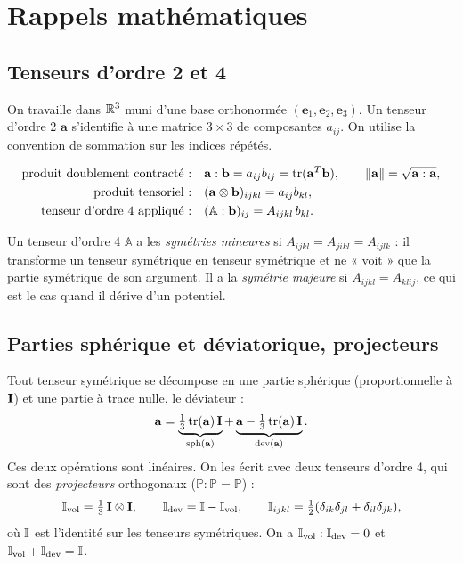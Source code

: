 \section{Rappels mathématiques}\label{sec:maths}

\subsection{Tenseurs d'ordre 2 et 4}

On travaille dans $\mathbb{R}^3$ muni d'une base orthonormée $(\mathbf{e}_1,\mathbf{e}_2,\mathbf{e}_3)$. Un tenseur d'ordre 2 $\mathbf{a}$ s'identifie à une matrice $3\times3$ de composantes $a_{ij}$. On utilise la convention de sommation sur les indices répétés.

\begin{definition}[Produits]
\begin{align*}
\text{produit doublement contracté :}\quad & \mathbf{a}:\mathbf{b} = a_{ij}b_{ij} = \operatorname{tr}(\mathbf{a}^T\mathbf{b}),\qquad \|\mathbf{a}\| = \sqrt{\mathbf{a}:\mathbf{a}},\\
\text{produit tensoriel :}\quad & (\mathbf{a}\otimes\mathbf{b})_{ijkl} = a_{ij}b_{kl},\\
\text{tenseur d'ordre 4 appliqué :}\quad & (\mathbb{A}:\mathbf{b})_{ij} = A_{ijkl}\,b_{kl}.
\end{align*}
\end{definition}

Un tenseur d'ordre 4 $\mathbb{A}$ a les \emph{symétries mineures} si $A_{ijkl}=A_{jikl}=A_{ijlk}$ : il transforme un tenseur symétrique en tenseur symétrique et ne « voit » que la partie symétrique de son argument. Il a la \emph{symétrie majeure} si $A_{ijkl}=A_{klij}$, ce qui est le cas quand il dérive d'un potentiel.

\subsection{Parties sphérique et déviatorique, projecteurs}

Tout tenseur symétrique se décompose en une partie sphérique (proportionnelle à $\mathbf{I}$) et une partie à trace nulle, le déviateur :
\begin{equation}
\mathbf{a} = \underbrace{\tfrac13\operatorname{tr}(\mathbf{a})\,\mathbf{I}}_{\operatorname{sph}(\mathbf{a})} + \underbrace{\mathbf{a}-\tfrac13\operatorname{tr}(\mathbf{a})\,\mathbf{I}}_{\operatorname{dev}(\mathbf{a})}.
\end{equation}
Ces deux opérations sont linéaires. On les écrit avec deux tenseurs d'ordre 4, qui sont des \emph{projecteurs} orthogonaux ($\mathbb{P}:\mathbb{P}=\mathbb{P}$) :
\begin{equation}
\mathbb{I}_{\mathrm{vol}} = \tfrac13\,\mathbf{I}\otimes\mathbf{I},\qquad \mathbb{I}_{\mathrm{dev}} = \mathbb{I} - \mathbb{I}_{\mathrm{vol}},\qquad \mathbb{I}_{ijkl} = \tfrac12(\delta_{ik}\delta_{jl}+\delta_{il}\delta_{jk}),
\end{equation}
où $\mathbb{I}$ est l'identité sur les tenseurs symétriques. On a $\mathbb{I}_{\mathrm{vol}}:\mathbb{I}_{\mathrm{dev}}=0$ et $\mathbb{I}_{\mathrm{vol}}+\mathbb{I}_{\mathrm{dev}}=\mathbb{I}$.

